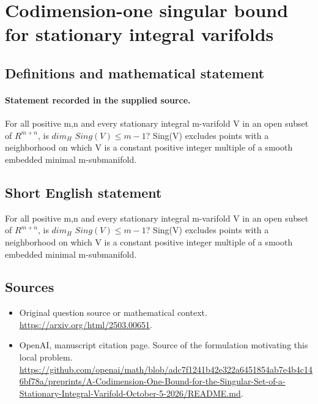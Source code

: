 \documentclass[11pt]{article}
\begin{document}
\section*{Codimension-one singular bound for stationary integral varifolds}\label{statement}
\subsection{Definitions and mathematical statement}
\paragraph{Statement recorded in the supplied source.}
For all positive m,n and every stationary integral m-varifold V in an open subset of $R^{m+n}$, is $dim_H$ $Sing(V)\leq m-1$? Sing(V) excludes points with a neighborhood on which V is a constant positive integer multiple of a smooth embedded minimal m-submanifold.
\subsection{Short English statement}
For all positive m,n and every stationary integral m-varifold V in an open subset of $R^{m+n}$, is $dim_H$ $Sing(V)\leq m-1$? Sing(V) excludes points with a neighborhood on which V is a constant positive integer multiple of a smooth embedded minimal m-submanifold.
\subsection{Sources}
\begin{itemize}
\item[S1] Original question source or mathematical context.
\url{https://arxiv.org/html/2503.00651}.
\item[S2] OpenAI, manuscript citation page. Source of the formulation motivating this local problem.
\url{https://github.com/openai/math/blob/adc7f1241b42e322a6451854ab7e4b4c146bf78a/preprints/A-Codimension-One-Bound-for-the-Singular-Set-of-a-Stationary-Integral-Varifold-October-5-2026/README.md}.
\end{itemize}
\end{document}
